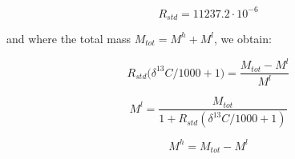 \documentclass[]{article}
\begin{document}
\begin{equation} 
R_{std} = 11237.2 \cdot 10^{-6}
\end{equation}

and where the total mass \(M_{tot} = M^h + M^l\), we obtain:

\begin{equation} 
R_{std}\Big(\delta ^{13}C/1000+1 \Big)= \frac{M_{tot}-M^l}{M^l}
\end{equation}

\begin{equation} 
M^l = \frac{M_{tot}}{1+R_{std}(\delta ^{13}C/1000+1)}
\end{equation}

\begin{equation} 
M^h = M_{tot} - M^l 
\end{equation}

\renewcommand\refname{References}

\end{document}
